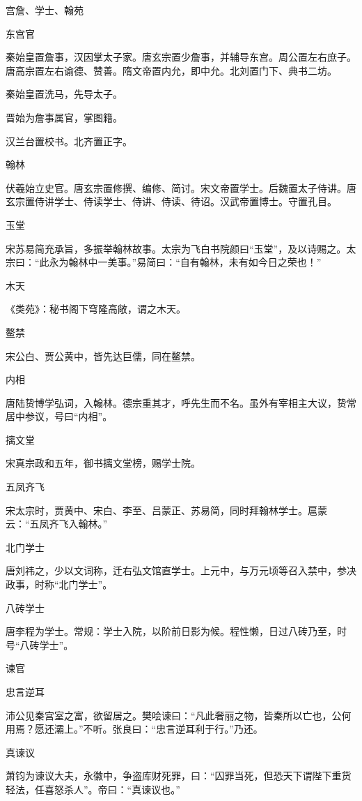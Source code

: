\documentclass[a4paper,12pt,UTF8,twoside]{ctexbook}
\begin{document}
    宫詹、学士、翰苑
    
    东宫官
    
    秦始皇置詹事，汉因掌太子家。唐玄宗置少詹事，并辅导东宫。周公置左右庶子。唐高宗置左右谕德、赞善。隋文帝置内允，即中允。北刘置门下、典书二坊。
    
    秦始皇置洗马，先导太子。
    
    晋始为詹事属官，掌图籍。
    
    汉兰台置校书。北齐置正字。
    
    翰林
    
    伏羲始立史官。唐玄宗置修撰、编修、简讨。宋文帝置学士。后魏置太子侍讲。唐玄宗置侍讲学士、侍读学士、侍讲、侍读、待诏。汉武帝置博士。守置孔目。
    
    玉堂
    
    宋苏易简充承旨，多振举翰林故事。太宗为飞白书院颜曰“玉堂”，及以诗赐之。太宗曰：“此永为翰林中一美事。”易简曰：“自有翰林，未有如今日之荣也！”
    
    木天
    
    《类苑》：秘书阁下穹隆高敞，谓之木天。
    
    鳌禁
    
    宋公白、贾公黄中，皆先达巨儒，同在鳌禁。
    
    内相
    
    唐陆贽博学弘词，入翰林。德宗重其才，呼先生而不名。虽外有宰相主大议，贽常居中参议，号曰“内相”。
    
    摛文堂
    
    宋真宗政和五年，御书摛文堂榜，赐学士院。
    
    五凤齐飞
    
    宋太宗时，贾黄中、宋白、李至、吕蒙正、苏易简，同时拜翰林学士。扈蒙云：“五凤齐飞入翰林。”
    
    北门学士
    
    唐刘祎之，少以文词称，迁右弘文馆直学士。上元中，与万元顷等召入禁中，参决政事，时称“北门学士”。
    
    八砖学士
    
    唐李程为学士。常规：学士入院，以阶前日影为候。程性懒，日过八砖乃至，时号“八砖学士”。
    
    谏官
    
    忠言逆耳
    
    沛公见秦宫室之富，欲留居之。樊哙谏曰：“凡此奢丽之物，皆秦所以亡也，公何用焉？愿还灞上。”不听。张良曰：“忠言逆耳利于行。”乃还。
    
    真谏议
    
    萧钧为谏议大夫，永徽中，争盗库财死罪，曰：“囚罪当死，但恐天下谓陛下重货轻法，任喜怒杀人”。帝曰：“真谏议也。”
    
\end{document}
